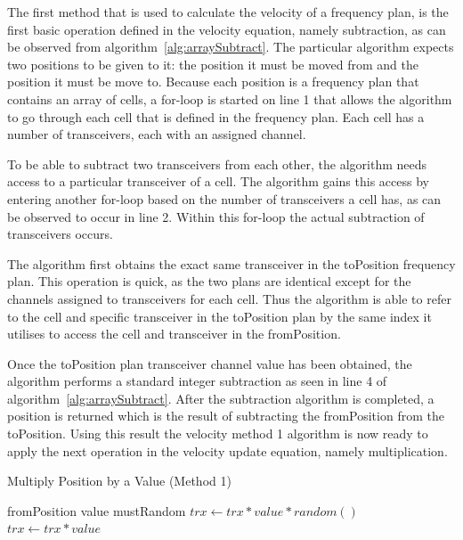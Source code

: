 The first method that is used to calculate the velocity of a frequency plan, is the first basic operation defined in the velocity equation, namely subtraction, as can be observed from algorithm~\ref{alg:arraySubtract}. The particular algorithm expects two positions to be given to it: the position it must be moved from and the position it must be move to. Because each position is a frequency plan that contains an array of cells, a for-loop is started on line 1 that allows the algorithm to go through each cell that is defined in the frequency plan. Each cell has a number of transceivers, each with an assigned channel. 

To be able to subtract two transceivers from each other, the algorithm needs access to a particular transceiver of a cell. The algorithm gains this access by entering another for-loop based on the number of transceivers a cell has, as can be observed to occur in line 2. Within this for-loop the actual subtraction of transceivers occurs.

The algorithm first obtains the exact same transceiver in the toPosition frequency plan. This operation is quick, as the two plans are identical except for the channels assigned to transceivers for each cell. Thus the algorithm is able to refer to the cell and specific transceiver in the toPosition plan by the same index it utilises to access the cell and transceiver in the fromPosition.

Once the toPosition plan transceiver channel value has been obtained, the algorithm performs a standard integer subtraction as seen in line 4 of algorithm~\ref{alg:arraySubtract}.
After the subtraction algorithm is completed, a position is returned which is the result of subtracting the fromPosition from the toPosition. Using this result the velocity method 1 algorithm is now ready to apply the next operation in the velocity update equation, namely multiplication.

\begin{algorithm}
\caption{Multiply Position by a Value (Method 1)}
\label{alg:arrayMultiply}
\begin{algorithmic}[1]
	\Require fromPosition
	\Require value
	\Require mustRandom
				\State $trx \leftarrow trx * value * random()$
			\Else
				\State $trx \leftarrow trx * value$
			\EndIf
		\EndFor
	\EndFor
\end{algorithmic}
\end{algorithm}

